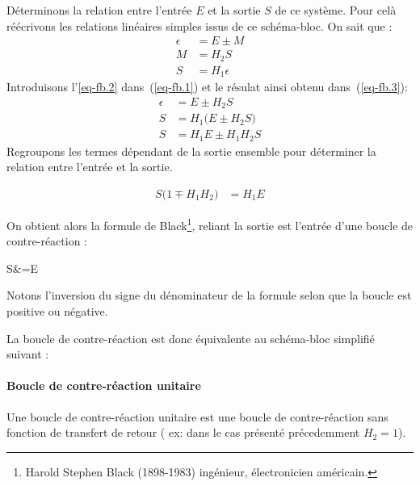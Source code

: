 Déterminons la relation entre l'entrée $E$ et la sortie $S$ de ce système.
Pour celà réécrivons les relations linéaires simples issus de ce schéma-bloc.
On sait que :
\begin{align}
    \epsilon&=E\pm M \label{eq-fb.1}\\
    M&=H_2S       \label{eq-fb.2}\\
    S&=H_1\epsilon \label{eq-fb.3}
\end{align}
Introduisons l'\cref{eq-fb.2} dans~(\ref{eq-fb.1}) et le résulat ainsi obtenu dans~(\ref{eq-fb.3}):
\begin{align*}
    \epsilon&=E\pm H_2S \\
     S&=H_1\big(E\pm H_2S\big) \\
     S&=H_1E\pm H_1H_2S
\end{align*}
Regroupons les termes dépendant de la sortie ensemble pour déterminer la relation entre l'entrée et la sortie.

\begin{align*}
    S\big(1\mp H_1H_2\big)&=H_1E 
\end{align*}

On obtient alors la formule de Black\footnote{Harold Stephen Black (1898-1983) ingénieur, 
électronicien américain.}, 
reliant la sortie est l'entrée d'une boucle de contre-réaction :
\begin{bequation}
    S&=E
\end{bequation}

Notons l'inversion du signe du dénominateur de la formule 
selon que la boucle est positive ou négative.

La boucle de contre-réaction est donc équivalente au schéma-bloc simplifié suivant :
\begin{center}
\end{center}


\paragraph{Boucle de contre-réaction unitaire}

Une boucle de contre-réaction unitaire est une boucle de contre-réaction sans 
fonction de transfert de retour ( ex: dans le cas présenté précedemment $H_2=1$).

